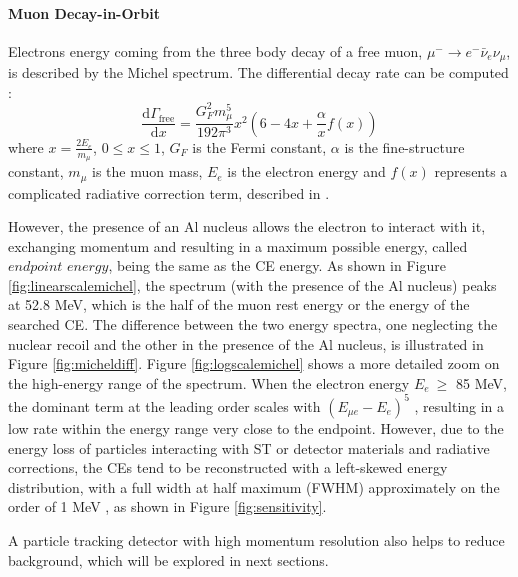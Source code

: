 \paragraph{Muon Decay-in-Orbit}
Electrons energy coming from the three body decay of a free muon, 
$\mu^- \rightarrow e^- \bar{\nu}_e \nu_\mu$, is described by the Michel 
spectrum. The differential decay rate can be computed \cite{michel}:
\begin{equation}
    \frac{\text{d}\Gamma_{\text{free}}}{\text{d}x}= \frac{G^2_F m^5_\mu}{192 \pi^3}x^2(6-4x+\frac{\alpha}{x}f(x)) 
\end{equation}
where $x=\frac{2 E_e}{m_\mu}$, $0\leq x\leq 1$, $G_F$ is the Fermi constant, 
$\alpha$ is the fine-structure constant, $m_\mu$ is the muon mass, $E_e$ is the 
electron energy and $f (x)$ represents a complicated radiative correction term, 
described in \cite{PhysRev.113.1652}.

However, the presence of an Al nucleus allows the electron to 
interact with it, exchanging momentum and resulting in a maximum possible energy, called 
$endpoint$ $energy$, being the same as the CE energy. 
As shown in Figure \ref{fig:linearscalemichel}, the spectrum (with the presence of the Al nucleus) peaks at 
52.8 MeV, which is the half of the muon rest energy or the energy of the searched CE.
The difference between the two energy spectra, one 
neglecting the nuclear recoil and the 
other in the presence of the Al nucleus, is illustrated in Figure \ref{fig:micheldiff}. 
Figure \ref{fig:logscalemichel} shows a more detailed zoom on the high-energy 
range of the spectrum. When the electron energy $E_e \ \geq$ 85 MeV, the dominant term 
at the leading order scales with $(E_{\mu e} - E_e)^5$ \cite{PhysRevD.84.013006}, 
resulting in a low rate within the energy range very close to the endpoint. However, due to 
the energy loss of particles interacting with ST or detector materials and radiative corrections, 
the CEs tend to be reconstructed with a left-skewed energy distribution,
with a full width at half maximum (FWHM) approximately on the order of 1 MeV 
\cite{gaponenko}, as shown in Figure \ref{fig:sensitivity}.

A particle tracking detector with high momentum resolution 
also helps to reduce background, which will be explored in next sections.



